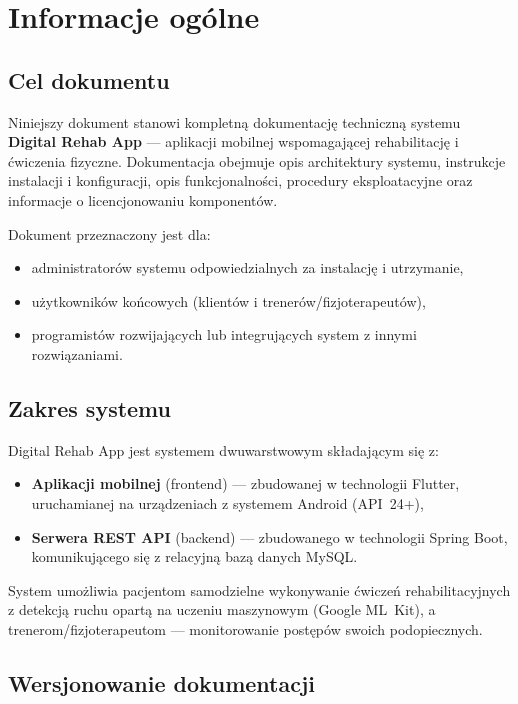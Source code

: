 \documentclass[12pt,a4paper]{article}
\begin{document}
\tableofcontents
\newpage

\section{Informacje ogólne}

\subsection{Cel dokumentu}

Niniejszy dokument stanowi kompletną dokumentację techniczną systemu \textbf{Digital Rehab App} --- aplikacji mobilnej wspomagającej rehabilitację i ćwiczenia fizyczne. Dokumentacja obejmuje opis architektury systemu, instrukcje instalacji i konfiguracji, opis funkcjonalności, procedury eksploatacyjne oraz informacje o licencjonowaniu komponentów.

Dokument przeznaczony jest dla:
\begin{itemize}
  \item administratorów systemu odpowiedzialnych za instalację i utrzymanie,
  \item użytkowników końcowych (klientów i trenerów/fizjoterapeutów),
  \item programistów rozwijających lub integrujących system z innymi rozwiązaniami.
\end{itemize}

\subsection{Zakres systemu}

Digital Rehab App jest systemem dwuwarstwowym składającym się z:
\begin{itemize}
  \item \textbf{Aplikacji mobilnej} (frontend) --- zbudowanej w technologii Flutter, uruchamianej na urządzeniach z systemem Android (API~24+),
  \item \textbf{Serwera REST API} (backend) --- zbudowanego w technologii Spring Boot, komunikującego się z relacyjną bazą danych MySQL.
\end{itemize}

System umożliwia pacjentom samodzielne wykonywanie ćwiczeń rehabilitacyjnych z detekcją ruchu opartą na uczeniu maszynowym (Google ML~Kit), a trenerom/fizjoterapeutom --- monitorowanie postępów swoich podopiecznych.

\subsection{Wersjonowanie dokumentacji}
\end{document}
